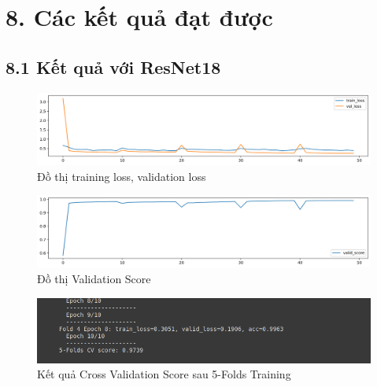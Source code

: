 \documentclass{article}
\begin{document}
	\section{8. Các kết quả đạt được}
	\subsection{8.1 Kết quả với ResNet18}
	\begin{figure}[H]
		\centering
		\includegraphics[width=1\linewidth]{results/resnet18/training_loss_results.png}
		\caption{Đồ thị training loss, validation loss}
		\label{fig:writing-thesis}
	\end{figure}
	\begin{figure}[H]
		\centering
		\includegraphics[width=1\linewidth]{results/resnet18/valid_score_results.png}
		\caption{Đồ thị Validation Score}
		\label{fig:writing-thesis}
	\end{figure}
	\begin{figure}[H]
		\centering
		\includegraphics[width=1\linewidth]{results/resnet18/CV_Score_5_Folds_ResNet18.png}
		\caption{Kết quả Cross Validation Score sau 5-Folds Training}
		\label{fig:writing-thesis}
	\end{figure}
\end{document}
